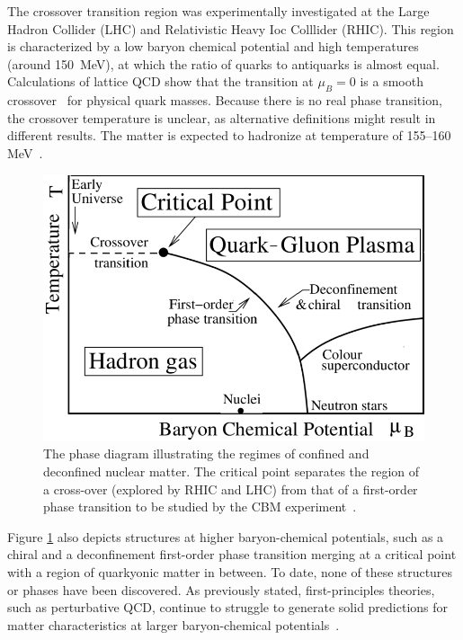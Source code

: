 The crossover transition region was experimentally investigated at the Large Hadron Collider (\gls{LHC}) and Relativistic Heavy Ioc Colllider (\gls{RHIC}). This region is characterized by a low baryon chemical potential and high temperatures (around 150~MeV), at which the ratio of quarks to antiquarks is almost equal. Calculations of lattice \gls{QCD} show that the transition at $\mu_{B} = 0$ is a smooth crossover~\cite{Aoki_2006} for
physical quark masses. Because there is no real phase transition, the crossover temperature is unclear, as alternative definitions might result in different results. The matter is expected to hadronize at temperature of 155--160 MeV~\cite{Bazavov_2012, Stachel_2014}.



\begin{figure}[!h]
\centering
 \includegraphics[width=0.65\columnwidth]{Chapter1/images/phase.png}
\caption{The phase diagram illustrating the regimes of confined and deconfined nuclear matter. The critical point separates the region of a cross-over (explored by RHIC and LHC) from that of a first-order phase transition to be studied by the CBM experiment~\cite{friese_diagram}.}
\label{fig_phase}
\end{figure}
\newpage
Figure \ref{fig_phase} also depicts structures at higher baryon-chemical potentials, such as a chiral and a deconfinement first-order phase transition merging at a critical point with a region of quarkyonic matter in between. To date, none of these structures or phases have been discovered. As previously stated, first-principles theories, such as perturbative QCD, continue to struggle to generate solid predictions for matter characteristics at larger baryon-chemical potentials~\cite{Sakai_2008, Fischer_01, Tawfik_01}. 



